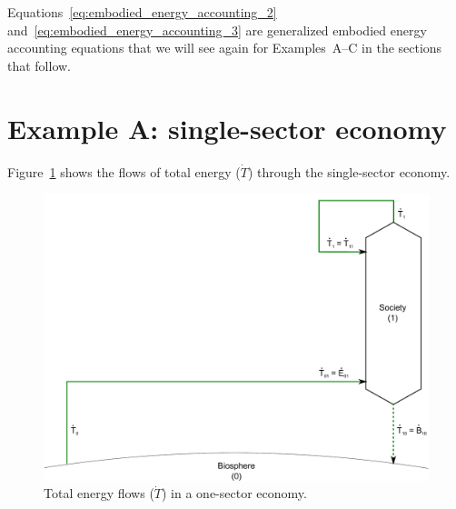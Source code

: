 Equations~\ref{eq:embodied_energy_accounting_2}
and~\ref{eq:embodied_energy_accounting_3} 
are generalized embodied energy accounting equations that we will
see again for Examples~A--C in the sections that follow. %


\section{Example A: single-sector economy} %
\label{sec:Embodied_Energy_Example_A}

Figure~\ref{fig:A_total_energy_T_dot} shows the flows 
of total energy ($\dot{T}$) through the single-sector economy.

\begin{landscape}
\begin{figure}[!ht]
\includegraphics[width=0.8\linewidth]{Part_1/Chapter_Embodied/images/1_sector_embodied_energy.pdf}
\caption[Total energy flows in a one-sector economy]{Total energy flows ($\dot{T}$) in a one-sector economy.}
\label{fig:A_total_energy_T_dot}
\end{figure}
\end{landscape}

